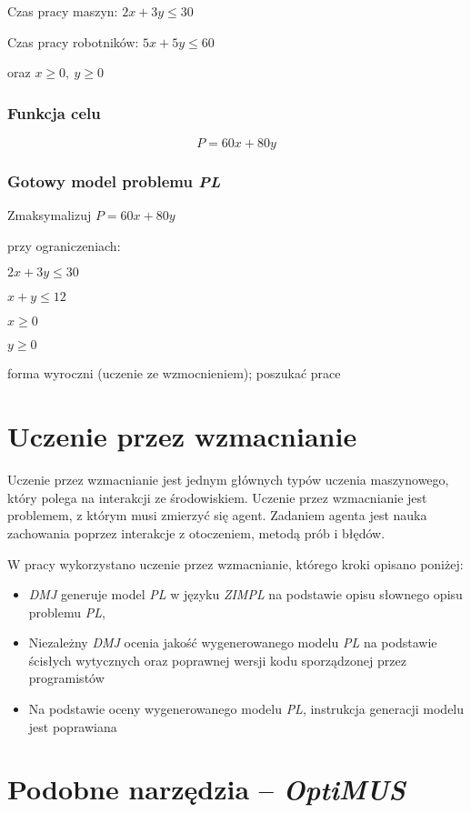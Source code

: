 Czas pracy maszyn: $2x + 3y \leq 30$

Czas pracy robotników: $5x + 5y \leq 60$

oraz $x \geq 0, \ y \geq 0$


\subsubsection*{Funkcja celu}
\[
    P = 60x + 80y
\]

\subsubsection*{Gotowy model problemu \textit{PL}}
    Zmaksymalizuj $P = 60x + 80y$

przy ograniczeniach:

    $2x + 3y \leq 30$
    
    $x + y \leq 12$
    
    $x  \geq 0$
    
    $y \geq 0$

forma wyroczni (uczenie ze wzmocnieniem); poszukać prace

\section{Uczenie przez wzmacnianie}
Uczenie przez wzmacnianie jest jednym głównych typów uczenia maszynowego, który polega na interakcji ze środowiskiem. Uczenie przez wzmacnianie jest problemem, z którym musi zmierzyć się agent. Zadaniem agenta jest nauka zachowania poprzez interakcje z otoczeniem, metodą prób i błędów.\cite{kaelbling1996reinforcement}

W pracy wykorzystano uczenie przez wzmacnianie, którego kroki opisano poniżej:
\begin{itemize}
    \item \textit{DMJ} generuje model \textit{PL} w języku \textit{ZIMPL} na podstawie opisu słownego opisu problemu \textit{PL},
    \item Niezależny \textit{DMJ} ocenia jakość wygenerowanego modelu \textit{PL} na podstawie ścisłych wytycznych oraz poprawnej wersji kodu sporządzonej przez programistów
    \item Na podstawie oceny wygenerowanego modelu \textit{PL}, instrukcja generacji modelu jest poprawiana
\end{itemize}

\section{Podobne narzędzia -- \textit{OptiMUS}\cite{ahmaditeshnizi2023optimus}}

